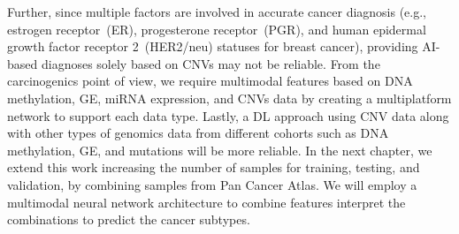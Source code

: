 \hspace*{3.5mm} Further, since multiple factors are involved in accurate cancer diagnosis (e.g., estrogen receptor~(ER), progesterone receptor~(PGR), and human epidermal growth factor receptor 2~(HER2/neu) statuses for breast cancer), providing AI-based diagnoses solely based on CNVs may not be reliable.
From the carcinogenics point of view, we require multimodal features based on DNA methylation, GE, miRNA expression, and CNVs data by creating a multiplatform network to support each data type. Lastly, a DL approach using CNV data along with other types of genomics data from different cohorts such as DNA methylation, GE, and mutations will be more reliable. In the next chapter, we extend this work increasing the number of samples for training, testing, and validation, by combining samples from Pan Cancer Atlas. We will employ a multimodal neural network architecture to combine features interpret the combinations to predict the cancer subtypes. 
